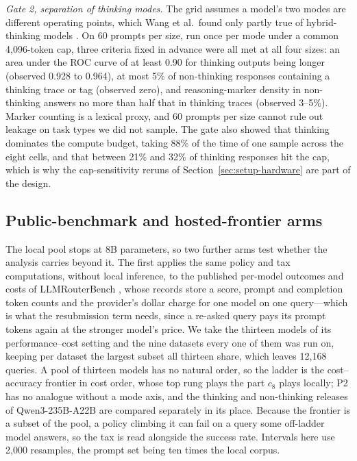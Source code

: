 \emph{Gate 2, separation of thinking modes.} The grid assumes a model's two
modes are different operating points, which Wang et al.\ found only partly
true of hybrid-thinking models \cite{wang2025demystifying}. On 60 prompts per
size, run once per mode under a common 4{,}096-token cap, three criteria
fixed in advance were all met at all four sizes: an area under the ROC curve
of at least 0.90 for thinking outputs being longer (observed 0.928 to 0.964),
at most 5\% of non-thinking responses containing a thinking trace or tag
(observed zero), and reasoning-marker density in non-thinking answers no more
than half that in thinking traces (observed 3--5\%). Marker counting is a
lexical proxy, and 60 prompts per size cannot rule out leakage on task types
we did not sample. The gate also showed that thinking dominates the compute
budget, taking 88\% of the time of one sample across the eight cells, and
that between 21\% and 32\% of thinking responses hit the cap, which is why
the cap-sensitivity reruns of Section~\ref{sec:setup-hardware} are part of
the design.

\subsection{Public-benchmark and hosted-frontier arms}
\label{sec:setup-arms}

The local pool stops at 8B parameters, so two further arms test whether the
analysis carries beyond it. The first applies the same policy and tax
computations, without local inference, to the published per-model outcomes
and costs of LLMRouterBench \cite{li2026llmrouterbench}, whose records store a
score, prompt and completion token counts and the provider's dollar charge
for one model on one query---which is what the resubmission term needs, since
a re-asked query pays its prompt tokens again at the stronger model's price.
We take the thirteen models of its performance--cost setting and the nine
datasets every one of them was run on, keeping per dataset the largest subset
all thirteen share, which leaves 12{,}168 queries. A pool of thirteen models
has no natural order, so the ladder is the cost--accuracy frontier in cost
order, whose top rung plays the part $c_8$ plays locally; P2 has no analogue
without a mode axis, and the thinking and non-thinking releases of
Qwen3-235B-A22B are compared separately in its place. Because the frontier is
a subset of the pool, a policy climbing it can fail on a query some
off-ladder model answers, so the tax is read alongside the success rate.
Intervals here use 2{,}000 resamples, the prompt set being ten times the
local corpus.

